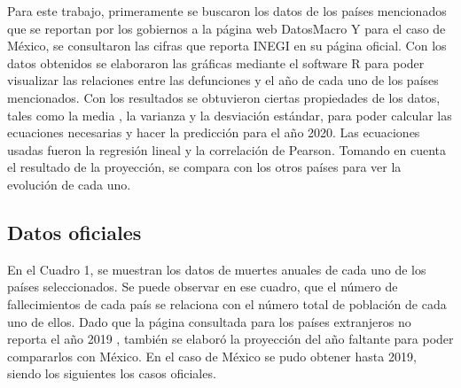 \documentclass[12pt]{article}
\begin{document}
Para este trabajo, primeramente se buscaron los datos de los países mencionados que se reportan por los gobiernos a la página web DatosMacro \cite{datosmacro}
Y para el caso de México, se consultaron las cifras que reporta INEGI en su página oficial\cite{inegi}. 
Con los datos obtenidos se elaboraron las gráficas mediante el software R \cite{rproject} para poder visualizar las relaciones entre las defunciones y el año de cada uno de los países mencionados.
Con los resultados se obtuvieron ciertas propiedades de los datos, tales como la media , la varianza y la desviación estándar, para poder calcular las ecuaciones necesarias y hacer la predicción para el año 2020.
Las ecuaciones usadas fueron la regresión lineal y la correlación de Pearson. 
Tomando en cuenta el resultado de la proyección, se compara con los otros países para ver la evolución de cada uno.


\subsection{Datos oficiales}
En el Cuadro 1, se muestran los datos de muertes anuales de cada uno de los países seleccionados.  
Se puede observar en ese cuadro, que el número de fallecimientos de cada país se relaciona con el número total de población de cada uno de ellos.
Dado que la página consultada para  los países extranjeros  no reporta el año 2019 , también se elaboró la proyección del año faltante para poder compararlos con México.
En el caso de México se pudo obtener hasta 2019, siendo los siguientes los casos oficiales.
\end{document}
